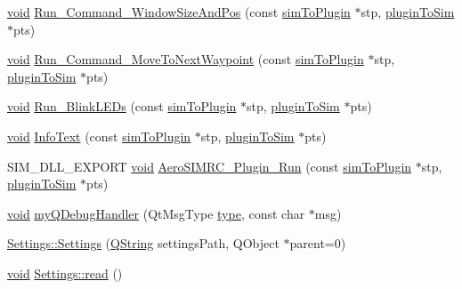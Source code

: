 \begin{DoxyCompactItemize}
\hyperlink{group___u_a_v_objects_plugin_ga444cf2ff3f0ecbe028adce838d373f5c}{void} \hyperlink{group___aero_sim_r_c_ga80a7533068c803af865f6e2af76e050d}{Run\-\_\-\-Command\-\_\-\-Window\-Size\-And\-Pos} (const \hyperlink{structsim_to_plugin}{sim\-To\-Plugin} $\ast$stp, \hyperlink{structplugin_to_sim}{plugin\-To\-Sim} $\ast$pts)
\item 
\hyperlink{group___u_a_v_objects_plugin_ga444cf2ff3f0ecbe028adce838d373f5c}{void} \hyperlink{group___aero_sim_r_c_gaddb6627411fb8bfecba79d9eb336638e}{Run\-\_\-\-Command\-\_\-\-Move\-To\-Next\-Waypoint} (const \hyperlink{structsim_to_plugin}{sim\-To\-Plugin} $\ast$stp, \hyperlink{structplugin_to_sim}{plugin\-To\-Sim} $\ast$pts)
\item 
\hyperlink{group___u_a_v_objects_plugin_ga444cf2ff3f0ecbe028adce838d373f5c}{void} \hyperlink{group___aero_sim_r_c_ga857614faa8daba5d5f4fede066c51132}{Run\-\_\-\-Blink\-L\-E\-Ds} (const \hyperlink{structsim_to_plugin}{sim\-To\-Plugin} $\ast$stp, \hyperlink{structplugin_to_sim}{plugin\-To\-Sim} $\ast$pts)
\item 
\hyperlink{group___u_a_v_objects_plugin_ga444cf2ff3f0ecbe028adce838d373f5c}{void} \hyperlink{group___aero_sim_r_c_gae510a372f225654c1363040357ba2c55}{Info\-Text} (const \hyperlink{structsim_to_plugin}{sim\-To\-Plugin} $\ast$stp, \hyperlink{structplugin_to_sim}{plugin\-To\-Sim} $\ast$pts)
\item 
S\-I\-M\-\_\-\-D\-L\-L\-\_\-\-E\-X\-P\-O\-R\-T \hyperlink{group___u_a_v_objects_plugin_ga444cf2ff3f0ecbe028adce838d373f5c}{void} \hyperlink{group___aero_sim_r_c_ga90f7f2f84473fc876d3189d4659dcf1a}{Aero\-S\-I\-M\-R\-C\-\_\-\-Plugin\-\_\-\-Run} (const \hyperlink{structsim_to_plugin}{sim\-To\-Plugin} $\ast$stp, \hyperlink{structplugin_to_sim}{plugin\-To\-Sim} $\ast$pts)
\item 
\hyperlink{group___u_a_v_objects_plugin_ga444cf2ff3f0ecbe028adce838d373f5c}{void} \hyperlink{group___aero_sim_r_c_ga7b01eb4372b4aee0f4d26504cfcd02a7}{my\-Q\-Debug\-Handler} (Qt\-Msg\-Type \hyperlink{glext_8h_a7d05960f4f1c1b11f3177dc963a45d86}{type}, const char $\ast$msg)
\item 
\hyperlink{group___aero_sim_r_c_ga93af04323b9db4a809d0376a1ea6a7ae}{Settings\-::\-Settings} (\hyperlink{group___u_a_v_objects_plugin_gab9d252f49c333c94a72f97ce3105a32d}{Q\-String} settings\-Path, Q\-Object $\ast$parent=0)
\item 
\hyperlink{group___u_a_v_objects_plugin_ga444cf2ff3f0ecbe028adce838d373f5c}{void} \hyperlink{group___aero_sim_r_c_gac0f3ec889ab03b807e937580704a3ee9}{Settings\-::read} ()

\end{DoxyCompactItemize}

